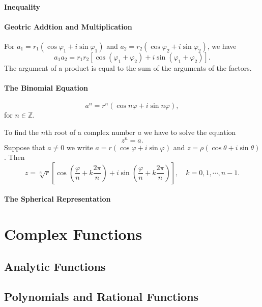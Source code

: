 \paragraph{Inequality}

\paragraph{Geotric Addtion and Multiplication} For \( a_1 = r_1 (\cos \varphi_1 + i \sin \varphi_1) \) and \(  a_2 = r_2 (\cos \varphi_2 + i \sin \varphi_2) \), we have
\[
  a_1 a_2 = r_1 r_2 [\cos (\varphi_1 + \varphi_2) + i \sin (\varphi_1 + \varphi_2)].
\]
The argument of a product is equal to the sum of the arguments of the factors.
\paragraph{The Binomial Equation}
\[
  a^n = r^n(\cos n \varphi + i \sin n \varphi),
\]
for \( n \in \mathbb{Z} \).

To find the \( n \)th root of a complex number \( a \) we have to solve the equation
\[
  z^n = a.
\]
Suppose that \( a \neq 0 \) we write \( a = r(\cos \varphi + i \sin \varphi) \) and \( z = \rho(\cos \theta + i \sin \theta) \).
Then
\[
  z = \sqrt[n]{r}\left[ \cos \left( \frac{\varphi}{n} + k\frac{2 \pi}{n} \right) + i \sin \left( \frac{\varphi}{n} + k \frac{2 \pi}{n} \right) \right],\quad k = 0, 1, \cdots, n - 1.
\]
\paragraph{The Spherical Representation}


\section{Complex Functions}


\subsection{Analytic Functions}


\subsection{Polynomials and Rational Functions}

